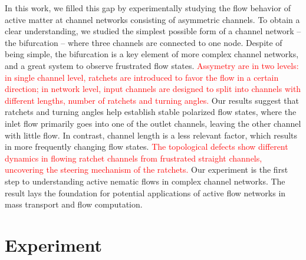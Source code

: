 \documentclass[%
10pt,
superscriptaddress,
twocolumn,
 amsmath,amssymb,
 aps,prx,
]{revtex4-2}
\newcommand{\red}[1]{\textcolor{red}{#1}}
\begin{document}


In this work, we filled this gap by experimentally studying the flow behavior of active matter at channel networks consisting of asymmetric channels. 
To obtain a clear understanding, we studied the simplest possible form of a channel network -- the bifurcation -- where three channels are connected to one node.
Despite of being simple, the bifurcation is a key element of more complex channel networks, and a great system to observe frustrated flow states.
\red{Assymetry are in two levels: in single channel level, ratchets are introduced to favor the flow in a certain direction; in network level, input channels are designed to split into channels with different lengths, number of ratchets and turning angles.}
Our results suggest that ratchets and turning angles help establish stable polarized flow states, where the inlet flow primarily goes into one of the outlet channels, leaving the other channel with little flow.
In contrast, channel length is a less relevant factor, which results in more frequently changing flow states.
\red{The topological defects show different dynamics in flowing ratchet channels from frustrated straight channels, uncovering the steering mechanism of the ratchets.}
Our experiment is the first step to understanding active nematic flows in complex channel networks.
The result lays the foundation for potential applications of active flow networks in mass transport and flow computation. 

\section{Experiment}
\end{document}
